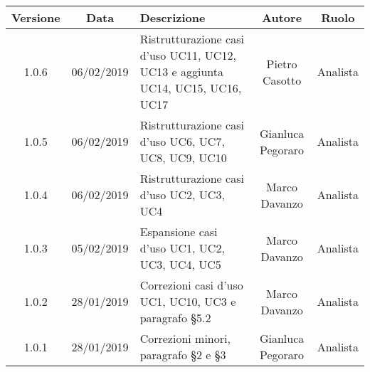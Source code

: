 \begin{table}[!htbp]
            \centering
            \renewcommand{\arraystretch}{2}
            \begin{tabular}{|c|c|p{5cm}|c|c|} %
                \rowcolor{orange!50} %
        		\hline
        		\textbf{Versione} & \textbf{Data} & \textbf{Descrizione} & \textbf{Autore} & \textbf{Ruolo} \\
        		\hline
        		1.0.6 & 06/02/2019 & Ristrutturazione casi d'uso UC11, UC12, UC13 e aggiunta UC14, UC15, UC16, UC17 & Pietro Casotto & Analista \\
        		\hline
        		1.0.5 & 06/02/2019 & Ristrutturazione casi d'uso UC6, UC7, UC8, UC9, UC10 & Gianluca Pegoraro & Analista \\
        		\hline
        		1.0.4 & 06/02/2019 & Ristrutturazione casi d'uso UC2, UC3, UC4 & Marco Davanzo & Analista \\
        		\hline
        		1.0.3 & 05/02/2019 & Espansione casi d'uso UC1, UC2, UC3, UC4, UC5 & Marco Davanzo & Analista \\
                \hline
        		1.0.2 & 28/01/2019 & Correzioni casi d'uso UC1, UC10, UC3 e paragrafo §5.2 & Marco Davanzo & Analista \\
                \hline
                1.0.1 & 28/01/2019 & Correzioni minori, paragrafo §2 e §3 & Gianluca Pegoraro & Analista \\
                \hline
        \end{tabular}
\end{table}



